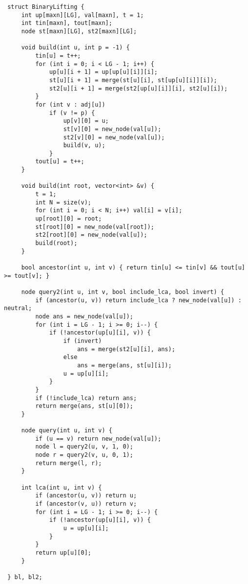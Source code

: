 \documentclass[11pt, a4paper, twoside]{article}
\begin{document}
\begin{lstlisting}
 struct BinaryLifting {
     int up[maxn][LG], val[maxn], t = 1;
     int tin[maxn], tout[maxn];
     node st[maxn][LG], st2[maxn][LG];
 
     void build(int u, int p = -1) {
         tin[u] = t++;
         for (int i = 0; i < LG - 1; i++) {
             up[u][i + 1] = up[up[u][i]][i];
             st[u][i + 1] = merge(st[u][i], st[up[u][i]][i]);
             st2[u][i + 1] = merge(st2[up[u][i]][i], st2[u][i]);
         }
         for (int v : adj[u])
             if (v != p) {
                 up[v][0] = u;
                 st[v][0] = new_node(val[u]);
                 st2[v][0] = new_node(val[u]);
                 build(v, u);
             }
         tout[u] = t++;
     }
 
     void build(int root, vector<int> &v) {
         t = 1;
         int N = size(v);
         for (int i = 0; i < N; i++) val[i] = v[i];
         up[root][0] = root;
         st[root][0] = new_node(val[root]);
         st2[root][0] = new_node(val[u]);
         build(root);
     }
 
     bool ancestor(int u, int v) { return tin[u] <= tin[v] && tout[u] >= tout[v]; }
 
     node query2(int u, int v, bool include_lca, bool invert) {
         if (ancestor(u, v)) return include_lca ? new_node(val[u]) : neutral;
         node ans = new_node(val[u]);
         for (int i = LG - 1; i >= 0; i--) {
             if (!ancestor(up[u][i], v)) {
                 if (invert)
                     ans = merge(st2[u][i], ans);
                 else
                     ans = merge(ans, st[u][i]);
                 u = up[u][i];
             }
         }
         if (!include_lca) return ans;
         return merge(ans, st[u][0]);
     }
 
     node query(int u, int v) {
         if (u == v) return new_node(val[u]);
         node l = query2(u, v, 1, 0);
         node r = query2(v, u, 0, 1);
         return merge(l, r);
     }
 
     int lca(int u, int v) {
         if (ancestor(u, v)) return u;
         if (ancestor(v, u)) return v;
         for (int i = LG - 1; i >= 0; i--) {
             if (!ancestor(up[u][i], v)) {
                 u = up[u][i];
             }
         }
         return up[u][0];
     }
 
 } bl, bl2;
\end{lstlisting}
\end{document}
